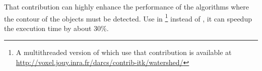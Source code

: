 \documentclass{InsightArticle}
\begin{document}
That contribution can highly enhance the performance of the algorithms where the contour of the objects must be detected. Use in \footnote{A multithreaded version of  which use that contribution is available at \url{http://voxel.jouy.inra.fr/darcs/contrib-itk/watershed/}} instead of , it can speedup the execution time by about 30\%.








\appendix





\end{document}
